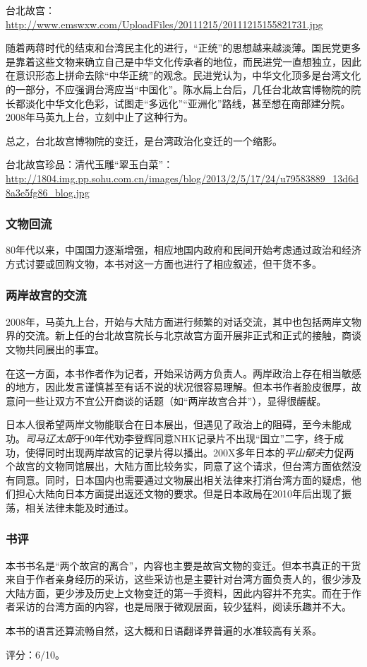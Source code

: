 台北故宫：\url{http://www.emswxw.com/UploadFiles/20111215/20111215155821731.jpg}

随着两蒋时代的结束和台湾民主化的进行，“正统”的思想越来越淡薄。国民党更多是靠着这些文物来确立自己是中华文化传承者的地位，而民进党一直想独立，因此在意识形态上拼命去除“中华正统”的观念。民进党认为，中华文化顶多是台湾文化的一部分，不应强调台湾应当“中国化”。陈水扁上台后，几任台北故宫博物院的院长都淡化中华文化色彩，试图走“多远化”“亚洲化”路线，甚至想在南部建分院。2008年马英九上台，立刻中止了这种行为。

总之，台北故宫博物院的变迁，是台湾政治化变迁的一个缩影。

台北故宫珍品：清代玉雕“翠玉白菜”：\url{http://1804.img.pp.sohu.com.cn/images/blog/2013/2/5/17/24/u79583889_13d6d8a3e5fg86_blog.jpg}

\subsubsection{文物回流}
80年代以来，中国国力逐渐增强，相应地国内政府和民间开始考虑通过政治和经济方式讨要或回购文物，本书对这一方面也进行了相应叙述，但干货不多。

\subsubsection{两岸故宫的交流}
2008年，马英九上台，开始与大陆方面进行频繁的对话交流，其中也包括两岸文物界的交流。新上任的台北故宫院长与北京故宫方面开展非正式和正式的接触，商谈文物共同展出的事宜。

在这一方面，本书作者作为记者，开始采访两方负责人。两岸政治上存在相当敏感的地方，因此发言谨慎甚至有话不说的状况很容易理解。但本书作者脸皮很厚，故意问一些让双方不宜公开商谈的话题（如“两岸故宫合并”），显得很龌龊。

日本人很希望两岸文物能联合在日本展出，但遇见了政治上的阻碍，至今未能成功。\emph{司马辽太郎}于90年代劝李登辉同意NHK记录片不出现“国立”二字，终于成功，使得同时出现两岸故宫的记录片得以播出。200X多年日本的\emph{平山郁夫}力促两个故宫的文物同馆展出，大陆方面比较务实，同意了这个请求，但台湾方面依然没有同意。同时，日本国内也需要通过文物展出相关法律来打消台湾方面的疑虑，他们担心大陆向日本方面提出返还文物的要求。但是日本政局在2010年后出现了振荡，相关法律未能及时通过。

\subsubsection{书评}
本书书名是“两个故宫的离合”，内容也主要是故宫文物的变迁。但本书真正的干货来自于作者亲身经历的采访，这些采访也是主要针对台湾方面负责人的，很少涉及大陆方面，更少涉及历史上文物变迁的第一手资料，因此内容并不充实。而在于作者采访的台湾方面的内容，也是局限于微观层面，较少猛料，阅读乐趣并不大。

本书的语言还算流畅自然，这大概和日语翻译界普遍的水准较高有关系。

评分：6/10。